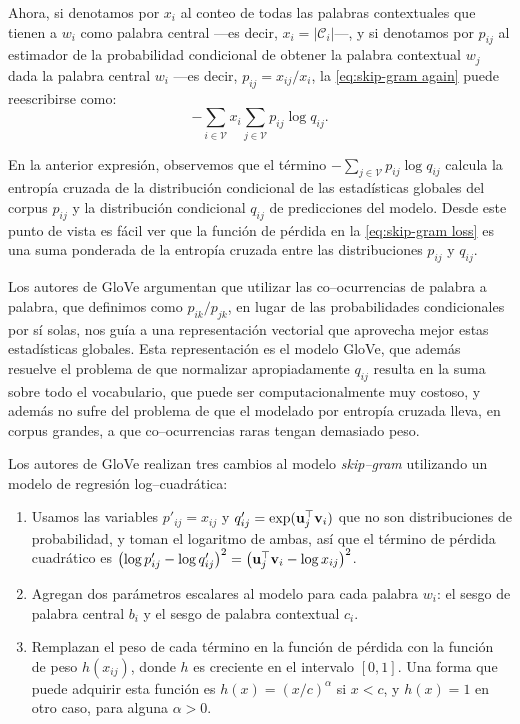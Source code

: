 \documentclass[12pt]{article}
\newcommand{\ce}{\bm{\textbf v}}
\newcommand{\co}{\bm{\textbf u}}
\begin{document}
Ahora, si denotamos por $ x_i $ al conteo de todas las palabras contextuales que tienen a $ w_i $ como palabra central ---es decir, $ x_i = |\mathcal{C}_i| $---, y si denotamos por $ p_{ij} $ al estimador de la probabilidad condicional de obtener la palabra contextual $ w_j $ dada la palabra central $ w_i $ ---es decir, $ p_{ij} =  x_{ij}/x_i $, la \cref{eq:skip-gram again} puede reescribirse como:
\begin{equation}
    -\sum_{i \in \mathcal{V}} x_{i}\sum_{j \in \mathcal{V}} p_{ij} \log q_{ij}.
\end{equation}

En la anterior expresión, observemos que el término $ -\sum_{j \in \mathcal{V}} p_{ij} \log q_{ij} $ calcula la entropía cruzada de la distribución condicional de las estadísticas globales del corpus $ p_{ij} $ y la distribución condicional $ q_{ij} $ de predicciones del modelo. Desde este punto de vista es fácil ver que la función de pérdida en la \cref{eq:skip-gram loss} es una suma ponderada de la entropía cruzada entre las distribuciones $ p_{ij} $ y $ q_{ij} $.

Los autores de GloVe argumentan que utilizar las co--ocurrencias de palabra a palabra, que definimos como $ p_{ik}/p_{jk} $, en lugar de las probabilidades condicionales por sí solas, nos guía a una representación vectorial que aprovecha mejor estas estadísticas globales. Esta representación es el modelo GloVe, que además resuelve el problema de que normalizar apropiadamente $ q_{ij} $ resulta en la suma sobre todo el vocabulario, que puede ser computacionalmente muy costoso, y además no sufre del problema de que el modelado por entropía cruzada lleva, en corpus grandes, a que co--ocurrencias raras tengan demasiado peso.

Los autores de GloVe realizan tres cambios al modelo \textit{skip--gram} utilizando un modelo de regresión log--cuadrática:
\begin{enumerate}
    \item Usamos las variables $ p'_{ij} = x_{ij} $ y $ q'_{ij} = \exp(\co_j^{\top}\ce_{i}) $ que no son distribuciones de probabilidad, y toman el logaritmo de ambas, así que el término de pérdida cuadrático es $ \left( \log p'_{ij} - \log q'_{ij}\right)^2 = \left( \co_j^{\top}\ce_i - \log x_{ij} \right)^2 $.
    
    \item Agregan dos parámetros escalares al modelo para cada palabra $ w_i $: el sesgo de palabra central $ b_i $ y el sesgo de palabra contextual $ c_i $.
    
    \item Remplazan el peso de cada término en la función de pérdida con la función de peso $ h(x_{ij}) $, donde $ h $ es creciente en el intervalo $ [0,1] $. Una forma que puede adquirir esta función es $ h(x) = (x / c)^{\alpha} $ si $ x < c $, y $ h(x) = 1 $ en otro caso, para alguna $ \alpha > 0 $.
\end{enumerate}
\end{document}
